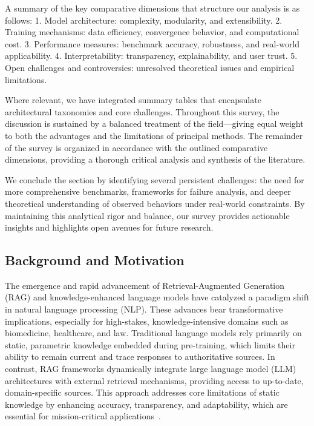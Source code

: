\documentclass[sigconf]{acmart}
\begin{document}
A summary of the key comparative dimensions that structure our analysis is as follows:
1. Model architecture: complexity, modularity, and extensibility.
2. Training mechanisms: data efficiency, convergence behavior, and computational cost.
3. Performance measures: benchmark accuracy, robustness, and real-world applicability.
4. Interpretability: transparency, explainability, and user trust.
5. Open challenges and controversies: unresolved theoretical issues and empirical limitations.

Where relevant, we have integrated summary tables that encapsulate architectural taxonomies and core challenges. Throughout this survey, the discussion is sustained by a balanced treatment of the field—giving equal weight to both the advantages and the limitations of principal methods. The remainder of the survey is organized in accordance with the outlined comparative dimensions, providing a thorough critical analysis and synthesis of the literature.

We conclude the section by identifying several persistent challenges: the need for more comprehensive benchmarks, frameworks for failure analysis, and deeper theoretical understanding of observed behaviors under real-world constraints. By maintaining this analytical rigor and balance, our survey provides actionable insights and highlights open avenues for future research.

\subsection{Background and Motivation}

The emergence and rapid advancement of Retrieval-Augmented Generation (RAG) and knowledge-enhanced language models have catalyzed a paradigm shift in natural language processing (NLP). These advances bear transformative implications, especially for high-stakes, knowledge-intensive domains such as biomedicine, healthcare, and law. Traditional language models rely primarily on static, parametric knowledge embedded during pre-training, which limits their ability to remain current and trace responses to authoritative sources. In contrast, RAG frameworks dynamically integrate large language model (LLM) architectures with external retrieval mechanisms, providing access to up-to-date, domain-specific sources. This approach addresses core limitations of static knowledge by enhancing accuracy, transparency, and adaptability, which are essential for mission-critical applications~\cite{ref4,ref5,ref10,ref14,ref15,ref16,ref17,ref46,ref47,ref48,ref51,ref52,ref54,ref55,ref64}.
\end{document}

